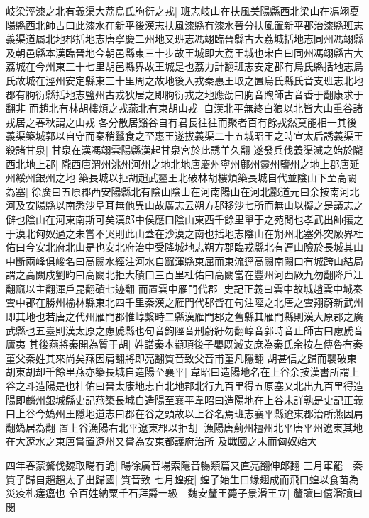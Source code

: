 岐梁涇漆之北有義渠大荔烏氏朐衍之戎|{
	班志岐山在扶風美陽縣西北梁山在馮翊夏陽縣西北師古曰此漆水在新平後漢志扶風漆縣有漆水晉分扶風置新平郡治漆縣班志義渠道屬北地郡括地志唐寧慶二州地又班志馮翊臨晉縣古大荔城括地志同州馮翊縣及朝邑縣本漢臨晉地今朝邑縣東三十步故王城即大荔王城也宋白曰同州馮翊縣古大荔城在今州東三十七里胡邑縣界故王城是也荔力計翻班志安定郡有烏氏縣括地志烏氏故城在涇州安定縣東三十里周之故地後入戎秦惠王取之置烏氏縣氏音支班志北地郡有朐衍縣括地志鹽州古戎狄居之即朐衍戎之地應劭曰朐音煦師古音香于翻康求于翻非}
而趙北有林胡樓煩之戎燕北有東胡山戎|{
	自漢北平無終白狼以北皆大山重谷諸戎居之春秋謂之山戎}
各分散居谿谷自有君長往往而聚者百有餘戎然莫能相一其後義渠築城郭以自守而秦稍蠶食之至惠王遂拔義渠二十五城昭王之時宣太后誘義渠王殺諸甘泉|{
	甘泉在漢馮翊雲陽縣漢起甘泉宮於此誘羊久翻}
遂發兵伐義渠滅之始於隴西北地上郡|{
	隴西唐渭州洮州河州之地北地唐慶州寧州鄜州靈州鹽州之地上郡唐延州綏州銀州之地}
築長城以拒胡趙武靈王北破林胡樓煩築長城自代並陰山下至高闕為塞|{
	徐廣曰五原郡西安陽縣北有陰山陰山在河南陽山在河北酈道元曰余按南河北河及安陽縣以南悉沙阜耳無他異山故廣志云朔方郡移沙七所而無山以擬之是議志之僻也陰山在河東南斯可矣漢郎中侯應曰陰山東西千餘里單于之苑閒也孝武出師攘之于漠北匈奴過之未嘗不哭則此山蓋在沙漠之南也括地志陰山在朔州北塞外突厥界杜佑曰今安北府北山是也安北府治中受降城地志朔方郡臨戎縣北有連山險於長城其山中斷兩峰俱峻名曰高闕水經注河水自窳渾縣東屈而東流逕高闕南闕口有城跨山結局謂之高闕戍劉昫曰高闕北拒大磧口三百里杜佑曰高闕當在豐州河西厥九勿翻降戶冮翻窳以主翻渾戶昆翻磧七迹翻}
而置雲中雁門代郡|{
	史記正義曰雲中故城趙雲中城秦雲中郡在勝州榆林縣東北四千里秦漢之雁門代郡皆在句注陘之北唐之雲翔蔚新武州即其地也若唐之代州雁門郡惟崞繫畤二縣漢雁門郡之舊縣其雁門縣則漢大原郡之廣武縣也五臺則漢太原之慮虒縣也句音鉤陘音刑蔚紆勿翻崞音郭時音止師古曰慮虒音廬夷}
其後燕將秦開為質于胡|{
	姓譜秦本顓頊後子嬰既滅支庶為秦氏余按左傳魯有秦堇父秦姓其來尚矣燕因肩翻將即亮翻質音致父音甫堇凡隱翻}
胡甚信之歸而襲破東胡東胡却千餘里燕亦築長城自造陽至襄平|{
	韋昭曰造陽地名在上谷余按漢書所謂上谷之斗造陽是也杜佑曰晉太康地志自北地郡北行九百里得五原塞又北出九百里得造陽即麟州銀城縣史記燕築長城自造陽至襄平韋昭曰造陽地在上谷未詳孰是史記正義曰上谷今媯州王隱地道志曰郡在谷之頭故以上谷名焉班志襄平縣遼東郡治所燕因肩翻媯居為翻}
置上谷漁陽右北平遼東郡以拒胡|{
	漁陽唐薊州檀州北平唐平州遼東其地在大遼水之東唐嘗置遼州又嘗為安東都護府治所}
及戰國之末而匈奴始大

四年春蒙驁伐魏取畼有詭|{
	畼徐廣音場索隱音暢類篇又直亮翻伸郎翻}
三月軍罷　秦質子歸自趙趙太子出歸國|{
	質音致}
七月蝗疫|{
	蝗子始生曰蝝翅成而飛曰蝗以食苗為災疫札瘥瘟也}
令百姓納粟千石拜爵一級　魏安釐王薨子景湣王立|{
	釐讀曰僖湣讀曰閔}


